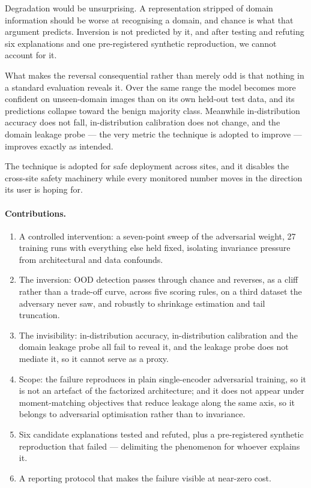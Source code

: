 \documentclass[11pt,a4paper]{article}
\begin{document}
Degradation would be unsurprising. A representation stripped of domain
information should be worse at recognising a domain, and chance is what that
argument predicts. Inversion is not predicted by it, and after testing and
refuting six explanations and one pre-registered synthetic reproduction, we
cannot account for it.

What makes the reversal consequential rather than merely odd is that nothing in
a standard evaluation reveals it. Over the same range the model becomes more
confident on unseen-domain images than on its own held-out test data, and its
predictions collapse toward the benign majority class. Meanwhile
in-distribution accuracy does not fall, in-distribution calibration does not
change, and the domain leakage probe --- the very metric the technique is
adopted to improve --- improves exactly as intended.

The technique is adopted for safe deployment across sites, and it disables the
cross-site safety machinery while every monitored number moves in the direction
its user is hoping for.

\paragraph{Contributions.}
\begin{enumerate}
\item A controlled intervention: a seven-point sweep of the adversarial weight,
27 training runs with everything else held fixed, isolating invariance pressure
from architectural and data confounds.
\item The inversion: OOD detection passes through chance and reverses, as a
cliff rather than a trade-off curve, across five scoring rules, on a third
dataset the adversary never saw, and robustly to shrinkage estimation and tail
truncation.
\item The invisibility: in-distribution accuracy, in-distribution calibration
and the domain leakage probe all fail to reveal it, and the leakage probe does
not mediate it, so it cannot serve as a proxy.
\item Scope: the failure reproduces in plain single-encoder adversarial
training, so it is not an artefact of the factorized architecture; and it does
not appear under moment-matching objectives that reduce leakage along the same
axis, so it belongs to adversarial optimisation rather than to invariance.
\item Six candidate explanations tested and refuted, plus a pre-registered
synthetic reproduction that failed --- delimiting the phenomenon for whoever
explains it.
\item A reporting protocol that makes the failure visible at near-zero cost.
\end{enumerate}
\end{document}
